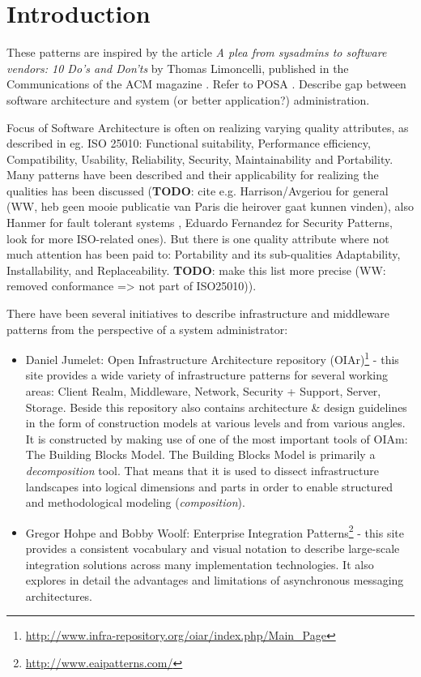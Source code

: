 \section{Introduction}
These patterns are inspired by the article \textit{A plea from sysadmins to software vendors: 10 Do's and Don'ts} by Thomas Limoncelli, published in the Communications of the ACM magazine \cite{Limoncelli2011a}. Refer to POSA \cite{Buschmann1996}. Describe gap between software architecture and system (or better application?) administration. 

Focus of Software Architecture is often on realizing varying quality attributes, as described in eg. ISO 25010: Functional suitability, Performance efficiency, Compatibility, Usability, Reliability, Security, Maintainability and Portability. Many patterns have been described and their applicability for realizing the qualities has been discussed (\textbf{TODO}: cite e.g. Harrison/Avgeriou for general (WW, heb geen mooie publicatie van Paris die heirover gaat kunnen vinden), also Hanmer for fault tolerant systems \cite{Hanmer2007}, Eduardo Fernandez for Security Patterns, look for more ISO-related ones). But there is one quality attribute where not much attention has been paid to: Portability and its sub-qualities Adaptability, Installability, and Replaceability. \textbf{TODO}: make this list more precise (WW: removed conformance => not part of ISO25010)).

There have been several initiatives to describe infrastructure and middleware patterns from the perspective of a system administrator:
\begin{itemize}
	\item Daniel Jumelet: Open Infrastructure Architecture repository (OIAr)\footnote{\url{http://www.infra-repository.org/oiar/index.php/Main_Page}} - this site provides a wide variety of infrastructure patterns for several working areas: Client Realm, Middleware, Network, Security + Support, Server, Storage. Beside this repository also contains architecture \& design guidelines in the form of construction models at various levels and from various angles. It is constructed by making use of one of the most important tools of OIAm: The Building Blocks Model. The Building Blocks Model is primarily a \textit{decomposition} tool. That means that it is used to dissect infrastructure landscapes into logical dimensions and parts in order to enable structured and methodological modeling (\textit{composition}).
	\item Gregor Hohpe and Bobby Woolf: Enterprise Integration Patterns\footnote{\url{http://www.eaipatterns.com/}} - this site provides a consistent vocabulary and visual notation to describe large-scale integration solutions across many implementation technologies. It also explores in detail the advantages and limitations of asynchronous messaging architectures. 
\end{itemize}

